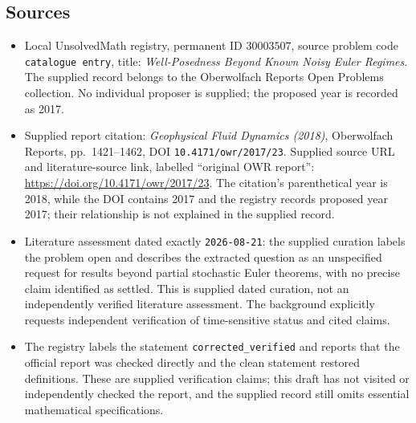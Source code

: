 \documentclass[11pt]{article}
\begin{document}
\subsection{Sources}
\begin{itemize}
\item Local UnsolvedMath registry, permanent ID \(30003507\), source problem code \texttt{catalogue entry}, title: \emph{Well-Posedness Beyond Known Noisy Euler Regimes}. The supplied record belongs to the Oberwolfach Reports Open Problems collection. No individual proposer is supplied; the proposed year is recorded as 2017.
\item Supplied report citation: \emph{Geophysical Fluid Dynamics (2018)}, Oberwolfach Reports, pp.\ 1421--1462, DOI \texttt{10.4171/owr/2017/23}. Supplied source URL and literature-source link, labelled ``original OWR report'': \url{https://doi.org/10.4171/owr/2017/23}. The citation's parenthetical year is 2018, while the DOI contains 2017 and the registry records proposed year 2017; their relationship is not explained in the supplied record.
\item Literature assessment dated exactly \texttt{2026-08-21}: the supplied curation labels the problem open and describes the extracted question as an unspecified request for results beyond partial stochastic Euler theorems, with no precise claim identified as settled. This is supplied dated curation, not an independently verified literature assessment. The background explicitly requests independent verification of time-sensitive status and cited claims.
\item The registry labels the statement \texttt{corrected\_verified} and reports that the official report was checked directly and the clean statement restored definitions. These are supplied verification claims; this draft has not visited or independently checked the report, and the supplied record still omits essential mathematical specifications.
\end{itemize}
\end{document}
